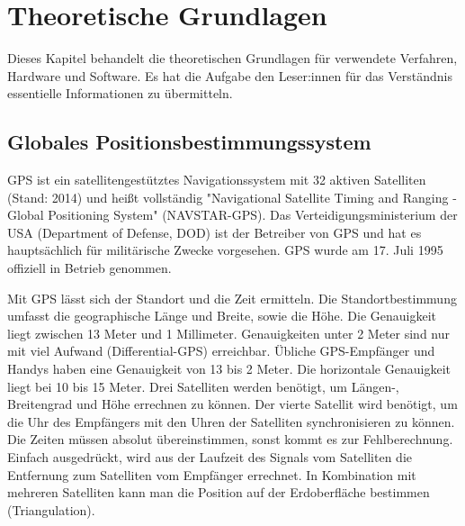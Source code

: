 \section{Theoretische Grundlagen}
\label{sec:theoretGrundl}
Dieses Kapitel behandelt die theoretischen Grundlagen für verwendete Verfahren, Hardware und Software. Es hat die Aufgabe den Leser:innen für das Verständnis essentielle Informationen zu übermitteln.
\subsection{Globales Positionsbestimmungssystem}
\label{subsec:GPS}
\glqq GPS ist ein satellitengestütztes Navigationssystem mit 32 aktiven Satelliten (Stand: 2014) und heißt vollständig "Navigational Satellite Timing and Ranging - Global Positioning System" (NAVSTAR-GPS). Das Verteidigungsministerium der USA (Department of Defense, DOD) ist der Betreiber von GPS und hat es hauptsächlich für militärische Zwecke vorgesehen. GPS wurde am 17. Juli 1995 offiziell in Betrieb genommen.

Mit GPS lässt sich der Standort und die Zeit ermitteln. Die Standortbestimmung umfasst die geographische Länge und Breite, sowie die Höhe. Die Genauigkeit liegt zwischen 13 Meter und 1 Millimeter. Genauigkeiten unter 2 Meter sind nur mit viel Aufwand (Differential-GPS) erreichbar. Übliche GPS-Empfänger und Handys haben eine Genauigkeit von 13 bis 2 Meter. Die horizontale Genauigkeit liegt bei 10 bis 15 Meter.
Drei Satelliten werden benötigt, um Längen-, Breitengrad und Höhe errechnen zu können. Der vierte Satellit wird benötigt, um die Uhr des Empfängers mit den Uhren der Satelliten synchronisieren zu können. Die Zeiten müssen absolut übereinstimmen, sonst kommt es zur Fehlberechnung.
Einfach ausgedrückt, wird aus der Laufzeit des Signals vom Satelliten die Entfernung zum Satelliten vom Empfänger errechnet. In Kombination mit mehreren Satelliten kann man die Position auf der Erdoberfläche bestimmen (Triangulation).\grqq \ \cite{schnabelGPS}